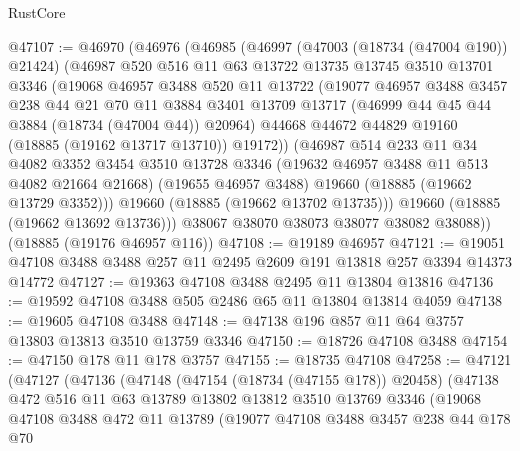 \begin{lexlean}{RustCore}
\begin{coremodule}
@47107 := @46970
    (@46976
      (@46985
        (@46997
          (@47003 (@18734 (@47004 @190)) @21424)
          (@46987
            @520
            @516
            @11
            @63
            @13722
            @13735
            @13745
            @3510
            @13701
            @3346
            (@19068
              @46957
              @3488
              @520
              @11
              @13722
              (@19077
                @46957
                @3488
                @3457
                @238
                @44
                @21
                @70
                @11
                @3884
                @3401
                @13709
                @13717
                (@46999 @44 @45 @44 @3884 (@18734 (@47004 @44)) @20964)
                @44668
                @44672
                @44829
                @19160
                (@18885 (@19162 @13717 @13710))
                @19172))
            (@46987
              @514
              @233
              @11
              @34
              @4082
              @3352
              @3454
              @3510
              @13728
              @3346
              (@19632 @46957 @3488 @11 @513 @4082 @21664 @21668)
              (@19655 @46957 @3488)
              @19660
              (@18885 (@19662 @13729 @3352)))
            @19660
            (@18885 (@19662 @13702 @13735)))
          @19660
          (@18885 (@19662 @13692 @13736)))
        @38067
        @38070
        @38073
        @38077
        @38082
        @38088))
    (@18885 (@19176 @46957 @116))
@47108 := @19189 @46957
@47121 := @19051 @47108 @3488 @3488 @257 @11 @2495 @2609 @191 @13818 @257 @3394 @14373 @14772
@47127 := @19363 @47108 @3488 @2495 @11 @13804 @13816
@47136 := @19592 @47108 @3488 @505 @2486 @65 @11 @13804 @13814 @4059
@47138 := @19605 @47108 @3488
@47148 := @47138 @196 @857 @11 @64 @3757 @13803 @13813 @3510 @13759 @3346
@47150 := @18726 @47108 @3488
@47154 := @47150 @178 @11 @178 @3757
@47155 := @18735 @47108
@47258 := @47121
    (@47127
      (@47136
        (@47148
          (@47154 (@18734 (@47155 @178)) @20458)
          (@47138
            @472
            @516
            @11
            @63
            @13789
            @13802
            @13812
            @3510
            @13769
            @3346
            (@19068
              @47108
              @3488
              @472
              @11
              @13789
              (@19077
                @47108
                @3488
                @3457
                @238
                @44
                @178
                @70

\end{coremodule}
\end{lexlean}
